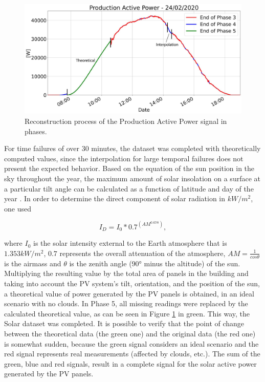 \begin{figure}[h!]
    \centering
    \begin{center}
    \includegraphics[width=1\textwidth]{Images/int0.png}
    \caption{Reconstruction process of the Production Active Power signal in phases.}
    \label{int0}
    \end{center}
\end{figure}

For time failures of over 30 minutes, the dataset was completed with theoretically computed values, since the interpolation for large temporal failures does not present the expected behavior.
Based on the equation of the sun position in the sky throughout the year, the maximum amount of solar insolation on a surface at a particular tilt angle can be calculated as a function of latitude and day of the year \cite{solar0}. In order to determine the direct component of solar radiation in $kW/m^2$, one used


\begin{equation}
     I_D = I_0*0.7^{(AM^{0.678})},
\label{solar}
\end{equation}

where $I_0$ is the solar intensity external to the Earth atmosphere that is $1.353 kW/m^2$, $0.7$ represents the overall attenuation of the atmosphere, $AM = \frac{1}{cos\theta}$ is the airmass and $\theta$ is the zenith angle (90° minus the altitude) of the sun. Multiplying the resulting value by the total area of panels in the building and taking into account the \ac{PV} system’s tilt, orientation, and the position of the sun, a theoretical value of power generated by the \ac{PV} panels is obtained, in an ideal scenario with no clouds. In Phase 5, all missing readings were replaced by the calculated theoretical value, as can be seen in Figure \ref{int0} in green. This way, the Solar dataset was completed. It is possible to verify that the point of change between the theoretical data (the green one) and the original data (the red one) is somewhat sudden, because the green signal considers an ideal scenario and the red signal represents real measurements (affected by clouds, etc.). The sum of the green, blue and red signals, result in a complete signal for the solar active power generated by the \ac{PV} panels. 


